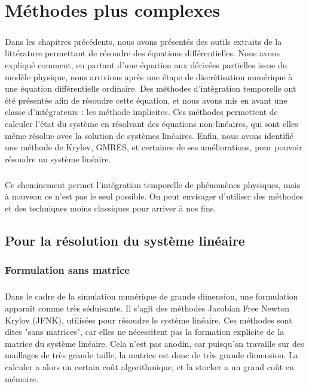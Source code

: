 \chapter{Méthodes plus complexes}

\paragraph{}
Dans les chapitres précédents, nous avons présentés des outils extraits de la littérature permettant de résoudre des équations différentielles.
Nous avons expliqué comment, en partant d'une équation aux dérivées partielles issue du modèle physique, nous arrivions après une étape de discrétisation numérique à une équation différentielle ordinaire.
Des méthodes d'intégration temporelle ont été présentée afin de résoudre cette équation, et nous avons mis en avant une classe d'intégrateurs : les méthode implicites.
Ces méthodes permettent de calculer l'état du système en résolvant des équations non-linéaires, qui sont elles même résolue avec la solution de systèmes linéaires.
Enfin, nous avons identifié une méthode de Krylov, GMRES, et certaines de ses améliorations, pour pouvoir résoudre un système linéaire.

\paragraph{}
Ce cheminement permet l'intégration temporelle de phénomènes physiques, mais à nouveau ce n'est pas le seul possible.
On peut envisager d'utiliser des méthodes et des techniques moins classiques pour arriver à nos fins.


\section{Pour la résolution du système linéaire}


  \subsection{Formulation sans matrice}

    \paragraph{}
    Dans le cadre de la simulation numérique de grande dimension, une formulation apparaît comme très séduisante.
    Il s'agit des méthodes Jacobian Free Newton Krylov (JFNK), utilisées pour résoudre le système linéaire.
    Ces méthodes sont dites "sans matrices", car elles ne nécessitent pas la formation explicite de la matrice du système linéaire.
    Cela n'est pas anodin, car puisqu'on travaille sur des maillages de très grande taille, la matrice est donc de très grande dimension.
    La calculer a alors un certain coût algorithmique, et la stocker a un grand coût en mémoire.

